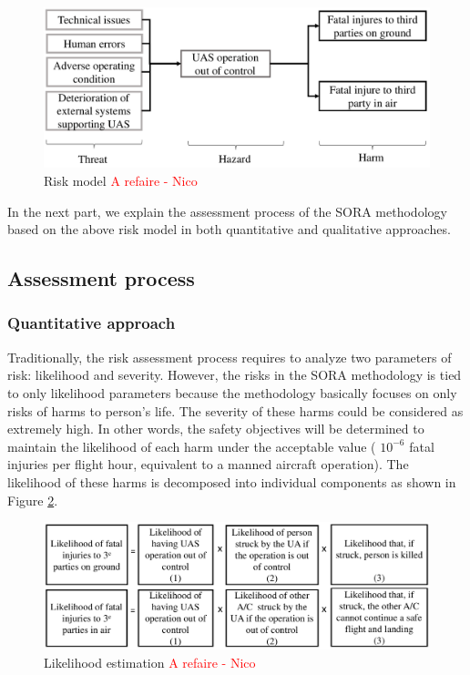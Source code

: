 \documentclass[a4paper, 10, conference]{ieeeconf}  %
\begin{document}
\begin{figure}[!ht]
	\centering
	\includegraphics[width=3.3 in]{image/Bow-tie_model.pdf}
	\caption{Risk model \textcolor{red}{A refaire - Nico}}
	\label{table: riskscenario}
\end{figure}  

 In the next part, we explain the assessment process of the SORA methodology based on the above risk model in both quantitative and qualitative approaches.

\subsection{Assessment process}

\subsubsection{Quantitative approach}
Traditionally, the risk assessment process requires to analyze two parameters of risk: likelihood and severity. However, the risks in the SORA methodology is tied to only likelihood parameters \cite{SORAV1} because the methodology basically focuses on only risks of harms to person's life. The severity of these harms could be considered as extremely high. In other words, the safety objectives will be determined to maintain the likelihood of each harm under the acceptable value ( $10^{-6}$ fatal injuries per flight hour, equivalent to a manned aircraft operation\cite{SORAV1}). The likelihood of these harms is decomposed into individual components as shown in Figure \ref{figure: likelihood estimation}. 

 \begin{figure}[!ht]
 	\centering
 	\includegraphics[width=3.4 in]{image/likelihood_estimation.pdf}
 	\caption{Likelihood estimation \cite{SORAV1} \textcolor{red}{A refaire - Nico}}
 	\label{figure: likelihood estimation}
 \end{figure}  
 
\end{document}
